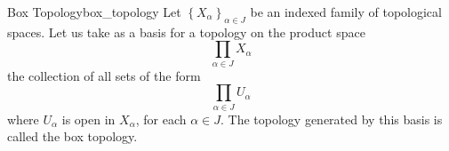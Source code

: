 \begin{definition}{Box Topology}{box_topology}
Let $\left\{X_{\alpha}\right\}_{\alpha \in J}$ be an indexed family of topological spaces. Let us take as a basis for a topology on the product space
$$
\prod_{\alpha \in J} X_{\alpha}
$$
the collection of all sets of the form
$$
\prod_{\alpha \in J} U_{\alpha}
$$
where $U_{\alpha}$ is open in $X_{\alpha}$, for each $\alpha \in J$. The topology generated by this basis is called the box topology.
\end{definition}
